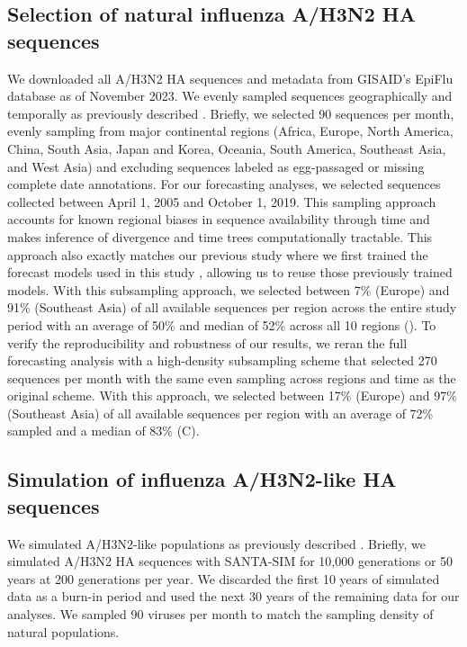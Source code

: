 \documentclass[9pt,lineno]{elife}
\begin{document}
\subsection{Selection of natural influenza A/H3N2 HA sequences}

We downloaded all A/H3N2 HA sequences and metadata from GISAID's EpiFlu database \citep{gisaid} as of November 2023.
We evenly sampled sequences geographically and temporally as previously described \citep{Huddleston2020}.
Briefly, we selected 90 sequences per month, evenly sampling from major continental regions (Africa, Europe, North America, China, South Asia, Japan and Korea, Oceania, South America, Southeast Asia, and West Asia) and excluding sequences labeled as egg-passaged or missing complete date annotations.
For our forecasting analyses, we selected sequences collected between April 1, 2005 and October 1, 2019.
This sampling approach accounts for known regional biases in sequence availability through time \citep{McCarron2022} and makes inference of divergence and time trees computationally tractable.
This approach also exactly matches our previous study where we first trained the forecast models used in this study \citep{Huddleston2020}, allowing us to reuse those previously trained models.
With this subsampling approach, we selected between 7\% (Europe) and 91\% (Southeast Asia) of all available sequences per region across the entire study period with an average of 50\% and median of 52\% across all 10 regions ().
To verify the reproducibility and robustness of our results, we reran the full forecasting analysis with a high-density subsampling scheme that selected 270 sequences per month with the same even sampling across regions and time as the original scheme.
With this approach, we selected between 17\% (Europe) and 97\% (Southeast Asia) of all available sequences per region with an average of 72\% sampled and a median of 83\% (C).

\subsection{Simulation of influenza A/H3N2-like HA sequences}

We simulated A/H3N2-like populations as previously described \citep{Huddleston2020}.
Briefly, we simulated A/H3N2 HA sequences with SANTA-SIM \citep{Jariani2019} for 10,000 generations or 50 years at 200 generations per year.
We discarded the first 10 years of simulated data as a burn-in period and used the next 30 years of the remaining data for our analyses.
We sampled 90 viruses per month to match the sampling density of natural populations.
\end{document}
